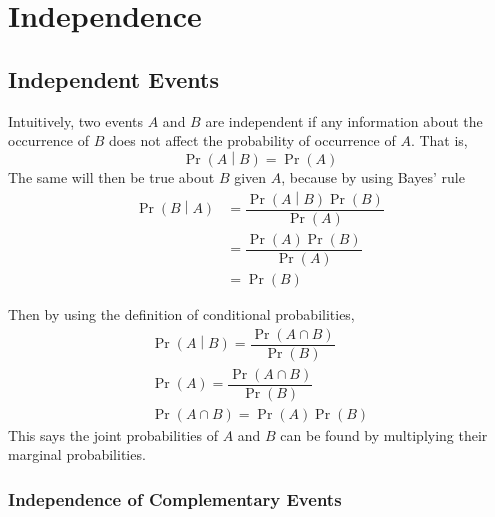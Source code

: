\documentclass[11pt]{report} %
\begin{document}
\section{Independence}

\subsection{Independent Events}

Intuitively, two events $A$ and $B$ are independent if any information about the occurrence of $B$  does not affect the probability of occurrence of $A$. That is, 
\begin{equation}
\operatorname{Pr}\left(A\middle|B\right) = \operatorname{Pr}\left(A\right)
\end{equation}
The same will then be true about $B$ given $A$, because by using Bayes' rule
\begin{align}
\operatorname{Pr}\left(B\middle|A\right) &= \dfrac{\operatorname{Pr}\left(A\middle|B\right)\operatorname{Pr}\left(B\right)}{\operatorname{Pr}\left(A\right)} \\
&= \dfrac{\operatorname{Pr}\left(A\right)\operatorname{Pr}\left(B\right)}{\operatorname{Pr}\left(A\right)} \\
&= \operatorname{Pr}\left(B\right)
\end{align}

Then by using the definition of conditional probabilities,
\begin{gather}
\operatorname{Pr}\left(A\middle|B\right) = \dfrac{\operatorname{Pr}\left(A\cap B\right)}{\operatorname{Pr}\left(B\right)} \\
\operatorname{Pr}\left(A\right) = \dfrac{\operatorname{Pr}\left(A\cap B\right)}{\operatorname{Pr}\left(B\right)} \\
\operatorname{Pr}\left(A\cap B\right) = \operatorname{Pr}\left(A\right)\operatorname{Pr}\left(B\right)
\end{gather}
This says the joint probabilities of $A$ and $B$ can be found by multiplying their marginal probabilities.

\subsubsection{Independence of Complementary Events}
\end{document}
